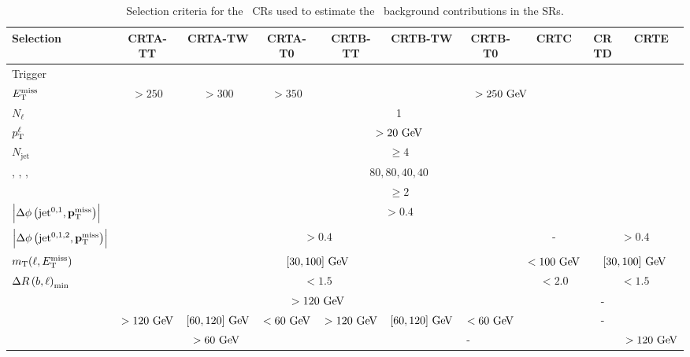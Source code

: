 		\begin{landscape}
		\begin{table}[htpb]
		  \caption{Selection criteria for the \ttbar\ \acp{CR} used to estimate the \ttbar\ background contributions in the \acp{SR}.} 
		  \begin{center}
		    \def\arraystretch{1.5}
			\tiny
		    \begin{tabular}{lccccccccc}
		      \toprule
		      \textbf{Selection}  & \textbf{CRTA-TT} & \textbf{CRTA-TW} & \textbf{CRTA-T0} & \textbf{CRTB-TT} & \textbf{CRTB-TW} & \textbf{CRTB-T0} & \textbf{CRTC} & \textbf{CRTD} & \textbf{CRTE} \\
		      \toprule
		      Trigger    & \multicolumn{9}{c}{\met}                                                                         \\ 
				 $E_{\mathrm{T}}^{\mathrm{miss}}$ & $ >250$ \gev & $ >300$ \gev & $ >350$ \gev & \multicolumn{6}{c}{$>250 \gev$} \\  \midrule
		      $N_{\ell}$ & \multicolumn{9}{c}{1}                                                                            \\ 
		     $p_{\mathrm{T}}^{\ell}$ & \multicolumn{9}{c}{$>20 \gev$}   \\ 
		     \midrule
		     $N_{\mathrm{jet}}$ & \multicolumn{9}{c}{$\ge 4$} \\ %
		      \ptzero, \ptone, \pttwo, \ptthree & \multicolumn{9}{c}{$80,80,40,40$ \gev} \\
		      \nBJet & \multicolumn{9}{c}{$ \ge 2 $}\\
				\midrule
		      $\left|\Delta\phi\left(\mathrm{jet}^{0,1},\mathbf{p}_\mathrm{T}^\mathrm{miss}\right)\right|$ & \multicolumn{9}{c}{$>0.4$} \\ 
		      $\left|\Delta\phi\left(\mathrm{jet}^{0,1,2},\mathbf{p}_\mathrm{T}^\mathrm{miss}\right)\right|$ & \multicolumn{6}{c}{$>0.4$} & - & \multicolumn{2}{c}{$>0.4$}\\ 
		      $m_{\mathrm{T}}(\ell,E_{\mathrm{T}}^{\mathrm{miss}})$   &     \multicolumn{6}{c}{$[30,100]\gev$} & $<100\gev$ & \multicolumn{2}{c}{$[30,100]\gev$}  \\ 
		       $\Delta R\left(b,\ell\right)_{\mathrm{min}}$ & \multicolumn{6}{c}{$<1.5$} & $<2.0$ &  \multicolumn{2}{c}{$<1.5$}\\
		       \midrule
		       \mantikttwelvezero      & \multicolumn{6}{c}{$>120 \gev$} & \multicolumn{3}{c}{-} \\ 
		       \mantikttwelveone      & $>120 \gev$  & $[60, 120] \gev$  & $<60 \gev$  & $>120 \gev$  & $[60, 120] \gev$  & $<60 \gev$ & \multicolumn{3}{c}{-} \\ 
				 \mantikteightzero      & \multicolumn{3}{c}{$>60 \gev$} &  \multicolumn{5}{c}{-} & $>120 \gev$ \\ 

\end{tabular}
\end{center}
\end{table}
\end{landscape}
